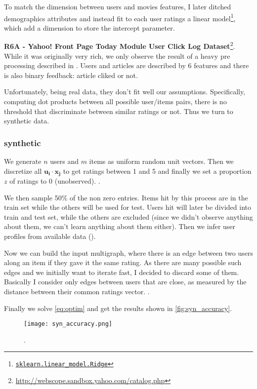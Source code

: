 To match the dimension between users and movies features, I later ditched
demographics attributes and instead fit to each user ratings a linear
model\footnote{\href{http://scikit-learn.org/stable/modules/generated/sklearn.linear_model.Ridge.html}%
{\texttt{sklearn.linear\_model.Ridge}}}, which add a dimension to store the
intercept parameter.

\textbf{R6A - Yahoo! Front Page Today Module User Click Log Dataset}\footnote{%
\href{http://webscope.sandbox.yahoo.com/catalog.php?datatype=r}%
{http://webscope.sandbox.yahoo.com/catalog.php}}.
While it was originally very rich, we only observe the result of a heavy pre
processing described in \autocite{YahooNews09}. Users and articles are
described by 6 features and there is also binary feedback: article cliked or
not.

Unfortunately, being real data, they don't fit well our assumptions.
Specifically, computing dot products between all possible user/items pairs,
there is no threshold that discriminate between similar ratings or not. Thus
we turn to synthetic data.

\subsubsection{synthetic}

We generate $n$ users and $m$ items as uniform random unit vectors. Then we
discretize all $\bm{u_i}\cdot \bm{x_j}$ to get ratings between 1 and 5 and
finally we set a proportion $z$ of ratings to 0 (unobserved). .

We then sample 50\% of the non zero entries. Items hit by this process are in
the train set while the others will be used for test. Users hit will later be
divided into train and test set, while the others are excluded (since we
didn't observe anything about them, we can't learn anything about them either).
Then we infer user profiles from available data ().

Now we can build the input multigraph, where there is an edge between two users
along an item if they gave it the same rating. As there are many possible such
edges and we initially want to iterate fast, I decided to discard some of them.
Basically I consider only edges between users that are close, as measured by
the distance between their common ratings vector. .

Finally we solve \eqref{eq:optim} and get the results shown in
\autoref{fig:syn_accuracy}.

\begin{figure}[hb]
	\centering
	\texttt{[image: syn\_accuracy.png]}
	\caption{.\label{fig:syn_accuracy}}
\end{figure}
